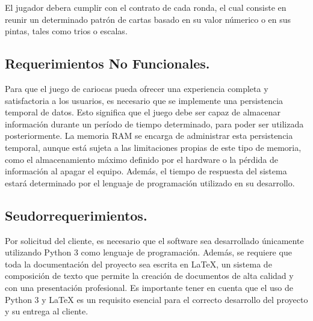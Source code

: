 El jugador debera cumplir con el contrato de cada ronda, el cual consiste en reunir un determinado patrón de cartas basado en su valor númerico o en sus pintas, tales como trios o escalas.


\subsection{Requerimientos No Funcionales.}\label{cap:requerimientos-no-funcionales}

Para que el juego de cariocas pueda ofrecer una experiencia completa y satisfactoria a los usuarios, es necesario que se implemente una persistencia temporal de datos. Esto significa que el juego debe ser capaz de almacenar información durante un período de tiempo determinado, para poder ser utilizada posteriormente. La memoria RAM se encarga de administrar esta persistencia temporal, aunque está sujeta a las limitaciones propias de este tipo de memoria, como el almacenamiento máximo definido por el hardware o la pérdida de información al apagar el equipo. Además, el tiempo de respuesta del sistema estará determinado por el lenguaje de programación utilizado en su desarrollo.

\subsection{Seudorrequerimientos.}\label{cap:seudorrequerimientos}
Por solicitud del cliente, es necesario que el software sea desarrollado únicamente utilizando Python 3 como lenguaje de programación. Además, se requiere que toda la documentación del proyecto sea escrita en LaTeX, un sistema de composición de texto que permite la creación de documentos de alta calidad y con una presentación profesional. Es importante tener en cuenta que el uso de Python 3 y LaTeX es un requisito esencial para el correcto desarrollo del proyecto y su entrega al cliente.
